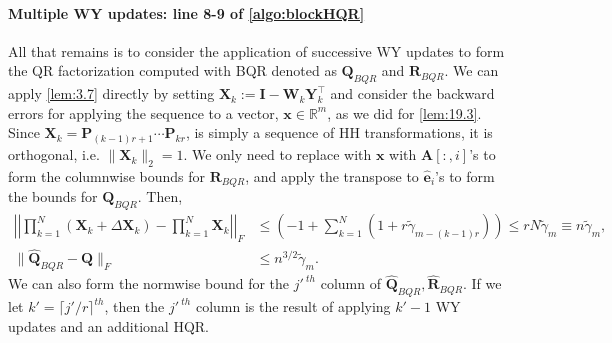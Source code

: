 \documentclass[review,onefignum,onetabnum]{siamart190516}
\newcommand{\R}{\mathbb{R}}
\newcommand{\bb}[1]{\mathbf{#1}}
\begin{document}
\paragraph{Multiple WY updates: line 8-9 of \cref{algo:blockHQR}}
All that remains is to consider the application of successive WY updates to form the QR factorization computed with BQR denoted as $\bb{Q}_{BQR}$ and $\bb{R}_{BQR}$. 
We can apply \cref{lem:3.7} directly by setting $\bb{X}_{k}:= \bb{I}-\bb{W}_{k}\bb{Y}_{k}^{\top}$ and consider the backward errors for applying the sequence to a vector, $\bb{x}\in\R^{m}$, as we did for \cref{lem:19.3}. 
Since $\bb{X}_{k}=\bb{P}_{(k-1)r+1}\cdots\bb{P}_{kr}$, is simply a sequence of HH transformations, it is orthogonal, i.e. $\|\bb{X}_{k}\|_2=1$.
We only need to replace with $\bb{x}$ with $\bb{A}[:,i]$'s to form the columnwise bounds for $\bb{R}_{BQR}$, and apply the transpose to $\hat{\bb{e}}_i$'s to form the bounds for $\bb{Q}_{BQR}$. 
Then, 
\begin{align}
\left|\left|\prod_{k=1}^N (\bb{X}_{k} + \Delta \bb{X}_{k})- \prod_{k=1}^N\bb{X}_{k} \right|\right|_F &\leq\left(-1+\sum_{k=1}^N (1+r\tilde{\gamma}_{m-(k-1)r})\right) \leq rN\tilde{\gamma}_m \equiv n\tilde{\gamma}_m ,\label{eqn:BQR-mp}\\%
\|\hat{\bb{Q}}_{BQR}-\bb{Q}\|_F&\leq n^{3/2}\tilde{\gamma}_m. \label{eqn:BQR}
\end{align}
We can also form the normwise bound for the $j'^{\ th}$ column of $\hat{\bb{Q}}_{BQR},\hat{\bb{R}}_{BQR}$. 
If we let $k' = \lceil j'/r\rceil^{th}$, then the $j'^{\ th}$ column is the result of applying $k'-1$ WY updates and an additional HQR. 
\end{document}
